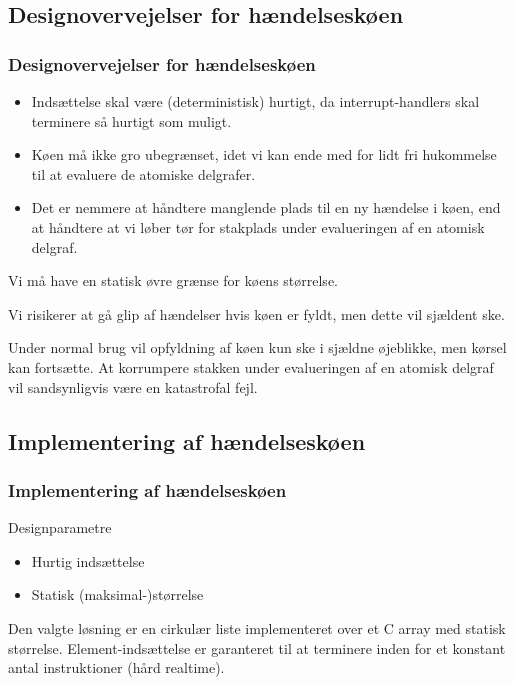 \documentclass{beamer}
\begin{document}
\subsection{Designovervejelser for hændelseskøen}
\begin{frame}
\frametitle{Designovervejelser for hændelseskøen}

\begin{itemize}
\item Indsættelse skal være (deterministisk) hurtigt, da
  interrupt-handlers skal terminere så hurtigt som muligt.
\item Køen må ikke gro ubegrænset, idet vi kan ende med for lidt fri
  hukommelse til at evaluere de atomiske delgrafer.
\item Det er nemmere at håndtere manglende plads til en ny hændelse i
  køen, end at håndtere at vi løber tør for stakplads under
  evalueringen af en atomisk delgraf.
\end{itemize}

Vi må have en statisk øvre grænse for køens størrelse.

Vi risikerer at gå glip af hændelser hvis køen er fyldt,  men dette
vil sjældent ske.

Under normal brug vil opfyldning af køen kun ske i sjældne øjeblikke,
men kørsel kan fortsætte.  At korrumpere stakken under evalueringen af
en atomisk delgraf vil sandsynligvis være en katastrofal fejl.

\end{frame}

\subsection{Implementering af hændelseskøen}
\begin{frame}
\frametitle{Implementering af hændelseskøen}

\begin{block}{Designparametre}
\begin{itemize}
\item Hurtig indsættelse
\item Statisk (maksimal-)størrelse
\end{itemize}
\end{block}

Den valgte løsning er en cirkulær liste implementeret over et C array
med statisk størrelse.  Element-indsættelse er garanteret til at
terminere inden for et konstant antal instruktioner (hård realtime).

\end{frame}
\end{document}
